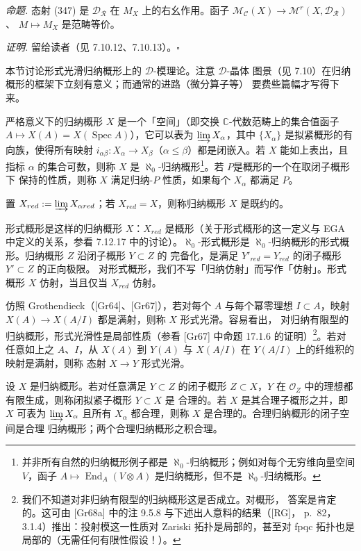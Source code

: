  \emph{命题.} 态射 (347) 是 $\mathcal{D}_{\mathcal{R}}$ 在
$M_X$ 上的右幺作用。函子
$\mathcal{M}_{\mathcal{C}}(X)\to\mathcal{M}^{r}(X,\mathcal{D}_{\mathcal{R}})$、
$M\mapsto M_X$ 是范畴等价。

\emph{证明.} 留给读者（见 7.10.12、7.10.13）。\hfill$\square$


本节讨论形式光滑归纳概形上的 $\mathcal{D}$-模理论。注意 $\mathcal{D}$-晶体
图景（见 7.10）在归纳概形的框架下立刻有意义；而通常的进路（微分算子等）
要费些篇幅才写得下来。

 严格意义下的归纳概形 $X$ 是一个「空间」（即交换
$\mathbb{C}$-代数范畴上的集合值函子
$A\mapsto X(A)=X(\operatorname{Spec}A)$），它可以表为
$\varinjlim X_\alpha$，其中 $\{X_\alpha\}$ 是拟紧概形的有向族，使得所有映射
$i_{\alpha\beta}:X_\alpha\to X_\beta$（$\alpha\le\beta$）都是闭嵌入。若 $X$
能如上表出，且指标 $\alpha$ 的集合可数，则称 $X$ 是
$\aleph_0$-归纳概形\footnote{并非所有自然的归纳概形例子都是
$\aleph_0$-归纳概形；例如对每个无穷维向量空间 $V$，函子
$A\mapsto\operatorname{End}_A(V\otimes A)$ 是归纳概形，但不是
$\aleph_0$-归纳概形。}。若 $P$是概形的一个在取闭子概形下
保持的性质，则称 $X$ 满足归纳-$P$ 性质，如果每个 $X_\alpha$ 都满足 $P$。

置 $X_{red}:=\varinjlim X_{\alpha red}$；若 $X_{red}=X$，则称归纳概形 $X$
是既约的。

形式概形是这样的归纳概形 $X$：$X_{red}$ 是概形（关于形式概形的这一定义与
EGA 中定义的关系，参看 7.12.17 中的讨论）。$\aleph_0$-形式概形是
$\aleph_0$-归纳概形的形式概形。归纳概形 $Z$ 沿闭子概形 $Y\subset Z$ 的
完备化，是满足 $Y'_{red}=Y_{red}$ 的闭子概形 $Y'\subset Z$ 的正向极限。
对形式概形，我们不写「归纳仿射」而写作「仿射」。形式概形 $X$ 仿射，当且仅当
$X_{red}$ 仿射。

仿照 Grothendieck（[Gr64]、[Gr67]），若对每个 $A$ 与每个幂零理想
$I\subset A$，映射 $X(A)\to X(A/I)$ 都是满射，则称 $X$ 形式光滑。容易看出，
对归纳有限型的归纳概形，形式光滑性是局部性质（参看 [Gr67] 中命题 17.1.6
的证明）\footnote{我们不知道对非归纳有限型的归纳概形这是否成立。对概形，
答案是肯定的。这可由 [Gr68a] 中的注 9.5.8 与下述出人意料的结果（[RG]，
p.~82，3.1.4）推出：投射模这一性质对 Zariski 拓扑是局部的，甚至对 fpqc
拓扑也是局部的（无需任何有限性假设！）。}。若对任意如上之 $A$、$I$，从
$X(A)$ 到 $Y(A)$ 与 $X(A/I)$ 在 $Y(A/I)$ 上的纤维积的映射是满射，则称
态射 $X\to Y$ 形式光滑。

设 $X$ 是归纳概形。若对任意满足 $Y\subset Z$ 的闭子概形 $Z\subset X$，$Y$
在 $\mathcal{O}_Z$ 中的理想都有限生成，则称闭拟紧子概形 $Y\subset X$ 是
合理的。若 $X$ 是其合理子概形之并，即 $X$ 可表为 $\varinjlim X_\alpha$
且所有 $X_\alpha$ 都合理，则称 $X$ 是合理的。合理归纳概形的闭子空间是合理
归纳概形；两个合理归纳概形之积合理。

